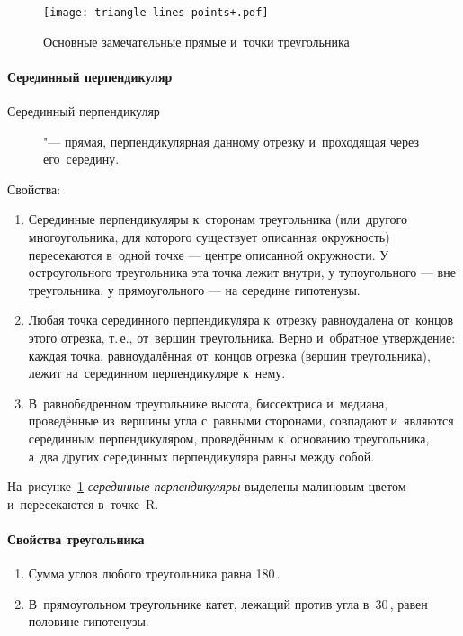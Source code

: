 \documentclass[]{scrartcl}
\begin{document}
\begin{figure}[ht]
	\centering %
	\texttt{[image: triangle-lines-points+.pdf]}
	\caption{Основные замечательные прямые и~точки треугольника}\label{fig:triangle-lines-points}
\end{figure} 

\paragraph{Серединный перпендикуляр}
\begin{description}
	\item[Серединный перпендикуляр] "---  прямая, перпендикулярная данному отрезку и~проходящая через его~середину.
\end{description}
Свойства:
\begin{enumerate}
	\item Серединные перпендикуляры к~сторонам треугольника (или~другого многоугольника, для которого существует описанная окружность) пересекаются в~одной точке — центре описанной окружности. У остроугольного треугольника эта точка лежит внутри, у тупоугольного — вне треугольника, у прямоугольного — на середине гипотенузы.
	\item Любая точка серединного перпендикуляра к~отрезку равноудалена от~концов этого отрезка, т.\,е., от~вершин треугольника. Верно и~обратное утверждение: каждая точка, равноудалённая от~концов отрезка (вершин треугольника), лежит на~серединном перпендикуляре к~нему.
	\item В~равнобедренном треугольнике высота, биссектриса и~медиана, проведённые из~вершины угла с~равными сторонами, совпадают и~являются серединным перпендикуляром, проведённым к~основанию треугольника, а~два других серединных перпендикуляра равны между собой.	
\end{enumerate}
На~рисунке~\ref{fig:triangle-lines-points} \emph{серединные перпендикуляры} выделены малиновым цветом и~пересекаются в~точке~R.
\paragraph{Свойства треугольника}
\begin{enumerate}
	\item Сумма углов любого треугольника равна 180\,\textdegree.
	\item В~прямоугольном треугольнике катет, лежащий против угла в~30\,\textdegree, равен половине гипотенузы.
\end{enumerate}
\end{document}
